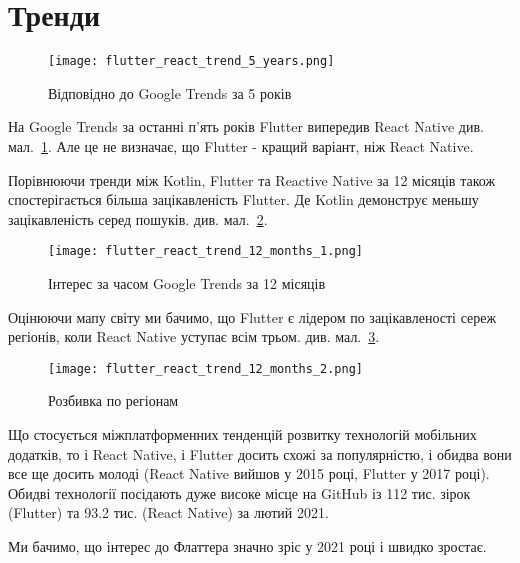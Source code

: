 \section{Тренди}
\label{sec:mobile_trends}

\begin{figure}
    \texttt{[image: flutter\_react\_trend\_5\_years.png]}
    \caption{Відповідно до Google Trends за 5 років}
    \label{fig:flutter_react_trend_5_years}
\end{figure}

На Google Trends за останні п’ять років Flutter випередив React Native див. мал.~\ref{fig:flutter_react_trend_5_years}.
Але це не визначає, що Flutter - кращий варіант, ніж React Native.

Порівнюючи тренди між Kotlin, Flutter та Reactive Native за 12 місяців також спостерігається більша зацікавленість Flutter.
Де Kotlin демонструє меньшу зацікавленість серед пошуків. див. мал.~\ref{fig:flutter_react_trend_12_months_1}.
\begin{figure}
    \texttt{[image: flutter\_react\_trend\_12\_months\_1.png]}
    \caption{Інтерес за часом Google Trends за 12 місяців \cite{google_trends}}
    \label{fig:flutter_react_trend_12_months_1}
\end{figure}

Оцінюючи мапу світу ми бачимо, що Flutter є лідером по зацікавленості сереж регіонів, коли React Native уступає всім трьом. див. мал.~\ref{fig:flutter_react_trend_12_months_2}.
\begin{figure}
    \texttt{[image: flutter\_react\_trend\_12\_months\_2.png]}
    \caption{Розбивка по регіонам \cite{google_trends}}
    \label{fig:flutter_react_trend_12_months_2}
\end{figure}

Що стосується міжплатформенних тенденцій розвитку технологій мобільних додатків, то і React Native, і Flutter досить схожі за популярністю, і обидва вони все ще досить молоді (React Native вийшов у 2015 році, Flutter у 2017 році).
Обидві технології посідають дуже високе місце на GitHub із 112 тис. зірок (Flutter) \cite{flutter_gihtub} та 93.2 тис. (React Native) \cite{rn_gihtub} за лютий 2021.

Ми бачимо, що інтерес до Флаттера значно зріс у 2021 році і швидко зростає.


